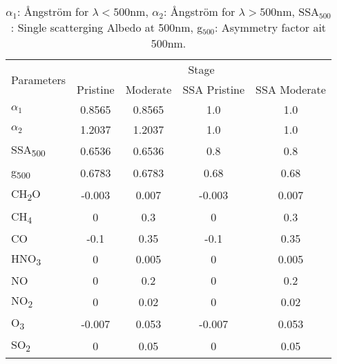 \begin{table}[H]
    \centering
    \begin{tabular}{lcccc}
        \hline
        \multicolumn{1}{c}{\multirow{2}{*}{Parameters}} & \multicolumn{4}{c}{Stage}                                          \\ \cline{2-5}
        \multicolumn{1}{c}{}                            & Pristine                  & Moderate & SSA Pristine & SSA Moderate \\ \hline
        $\alpha_1$                                      & 0.8565                    & 0.8565   & 1.0          & 1.0          \\
        $\alpha_2$                                      & 1.2037                    & 1.2037   & 1.0          & 1.0          \\
        SSA\textsubscript{500}                          & 0.6536                    & 0.6536   & 0.8          & 0.8          \\
        g\textsubscript{500}                            & 0.6783                    & 0.6783   & 0.68         & 0.68         \\
        CH\textsubscript{2}O                            & -0.003                    & 0.007    & -0.003       & 0.007        \\
        CH\textsubscript{4}                             & 0                         & 0.3      & 0            & 0.3          \\
        CO                                              & -0.1                      & 0.35     & -0.1         & 0.35         \\
        HNO\textsubscript{3}                            & 0                         & 0.005    & 0            & 0.005        \\
        NO                                              & 0                         & 0.2      & 0            & 0.2          \\
        NO\textsubscript{2}                             & 0                         & 0.02     & 0            & 0.02         \\
        O\textsubscript{3}                              & -0.007                    & 0.053    & -0.007       & 0.053        \\
        SO\textsubscript{2}                             & 0                         & 0.05     & 0            & 0.05         \\ \hline
    \end{tabular}
    \caption{$\alpha_1$: \AA ngstr\"om for $\lambda<500$nm,
        $\alpha_2$: \AA ngstr\"om  for $\lambda>500$nm,
        SSA$_{500}$: Single scatterging Albedo at 500nm,
        g$_{500}$: Asymmetry factor ait 500nm.}
    \label{table:parameters}
\end{table}
